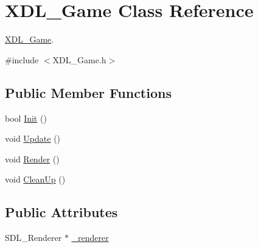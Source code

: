 \hypertarget{class_x_d_l___game}{\section{X\-D\-L\-\_\-\-Game Class Reference}
\label{class_x_d_l___game}
}


\hyperlink{class_x_d_l___game}{X\-D\-L\-\_\-\-Game}.  




{\ttfamily \#include $<$X\-D\-L\-\_\-\-Game.\-h$>$}

\subsection*{Public Member Functions}
\begin{DoxyCompactItemize}
\item 
bool \hyperlink{class_x_d_l___game_ab866479bed0d2d4ab2d8c40b8d2b1206}{Init} ()
\item 
void \hyperlink{class_x_d_l___game_afca16922cbee9332ac6b8fabf8078c4d}{Update} ()
\item 
void \hyperlink{class_x_d_l___game_a8259b7f7bc74722f423e0392cebef188}{Render} ()
\item 
void \hyperlink{class_x_d_l___game_a03405ef0205b25414b86d833cb4cd562}{Clean\-Up} ()
\end{DoxyCompactItemize}
\subsection*{Public Attributes}
\begin{DoxyCompactItemize}
\item 
S\-D\-L\-\_\-\-Renderer $\ast$ \hyperlink{class_x_d_l___game_a64e272606ee7d43ab1669794c098c2c4}{\-\_\-renderer}
\end{DoxyCompactItemize}
